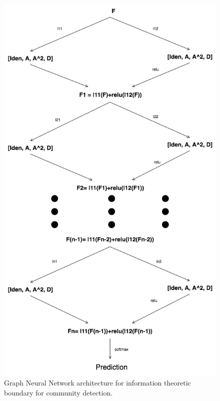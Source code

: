 \begin{figure}[h]
\begin{center}
  \includegraphics[scale=0.55]{GNN_SBM.png}
  \caption{Graph Neural Network architecture for information theoretic boundary for community detection.}
  \label{fig:GNN}
\end{center}
\end{figure}

